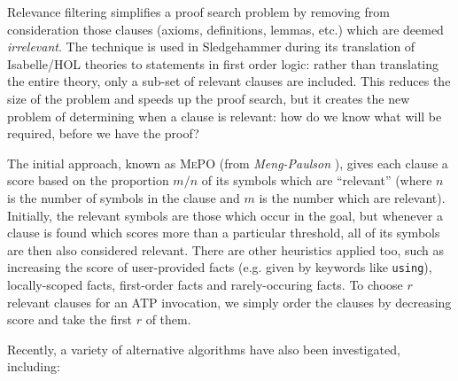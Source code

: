 Relevance filtering simplifies a proof search problem by removing from consideration those clauses (axioms, definitions, lemmas, etc.) which are deemed \emph{irrelevant}. The technique is used in Sledgehammer during its translation of Isabelle/HOL theories to statements in first order logic: rather than translating the entire theory, only a sub-set of relevant clauses are included. This reduces the size of the problem and speeds up the proof search, but it creates the new problem of determining when a clause is relevant: how do we know what will be required, before we have the proof?

The initial approach, known as \textsc{MePO} (from \emph{Meng-Paulson} \citep{meng2009lightweight}), gives each clause a score based on the proportion $m / n$ of its symbols which are ``relevant'' (where $n$ is the number of symbols in the clause and $m$ is the number which are relevant). Initially, the relevant symbols are those which occur in the goal, but whenever a clause is found which scores more than a particular threshold, all of its symbols are then also considered relevant. There are other heuristics applied too, such as increasing the score of user-provided facts (e.g. given by keywords like \texttt{using}), locally-scoped facts, first-order facts and rarely-occuring facts. To choose $r$ relevant clauses for an ATP invocation, we simply order the clauses by decreasing score and take the first $r$ of them.

Recently, a variety of alternative algorithms have also been investigated, including:

